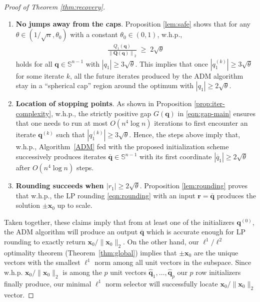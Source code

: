 \documentclass[11pt, journal, final]{IEEEtran}
\numberwithin{equation}{section}
\newcommand{\mb}{\mathbf}
\newcommand{\bb}{\mathbb}
\newcommand{\norm}[1]{\left\lVert#1\right\rVert}
\newcommand{\ol}{\overline}
\newcommand{ \abs }[1]{\left| #1 \right|}
\newcommand{ \paren }[1]{ \left( #1 \right) }
\begin{document}
{\begin{proof}[Proof of Theorem \ref{thm:recovery}]
\begin{enumerate}
\item \textbf{No jumps away from the caps}. Proposition \ref{lem:safe} shows that for any $\theta \in (1/\sqrt{n}, \theta_0)$ with a  constant $\theta_0 \in (0, 1)$, w.h.p.,
\begin{align*}
\frac{Q_1(\mb q)}{\norm{\mb Q(\mb q)}_2}\;\geq \; 2\sqrt{\theta}
\end{align*}
holds for all $\mb q\in \bb S^{n-1}$ with $\abs{q_1}\geq 3 \sqrt{\theta}$. This implies that once $|q_1^{(k)}| \geq 3\sqrt{\theta}$ for some iterate $k$, all the future iterates produced by the ADM algorithm stay in a ``spherical cap'' region around the optimum with $\abs{q_1} \geq 2 \sqrt{\theta} $.
\item \textbf{Location of stopping points}. As shown in Proposition \ref{prop:iter-complexity}, w.h.p., the strictly positive gap $G(\mb q)$ in \eqref{eqn:gap-main} ensures that one needs to run at most $O\paren{n^4 \log n}$ iterations to first encounter an iterate $\mb q^{(k)}$ such that $|q^{(k)}_1| \ge 3\sqrt{\theta}$. Hence, the steps above imply that, w.h.p., Algorithm~\ref{ADM} fed with the proposed initialization scheme successively produces iterates $\ol{\mb q}\in \bb S^{n-1}$ with its first coordinate $\abs{\ol{q}_1} \ge 2\sqrt{\theta}$ after $O\paren{n^4 \log n}$ steps.
\item \textbf{Rounding succeeds when $|r_1| \geq 2 \sqrt{\theta}$}. Proposition \ref{lem:rounding} proves that w.h.p., the LP rounding \eqref{eqn:rounding} with an input $\mb r = \ol{\mb q}$ produces the solution $\pm \mb x_0$ up to scale.
\end{enumerate}

Taken together, these claims imply that from at least one of the initializers $\mb q^{(0)}$, the ADM algorithm will produce an output $\ol{\mb q}$ which is accurate enough for LP rounding to exactly return $\mb x_0/\|\mb x_0\|_2$. On the other hand, our $\ell^1/\ell^2$ optimality theorem (Theorem~\ref{thm:global}) implies that $\pm \mb x_0$ are the unique vectors with the smallest $\ell^1$ norm among all unit vectors in the subspace. Since w.h.p. $\mb x_0/\|\mb x_0\|_2$ is among the $p$ unit vectors $\widehat{\mb q}_1, \dots, \widehat{\mb q}_p$ our $p$ row initializers finally produce, our minimal $\ell^1$ norm selector will successfully locate $\mb x_0/\|\mb x_0\|_2$ vector.


\end{proof}}
\end{document}
